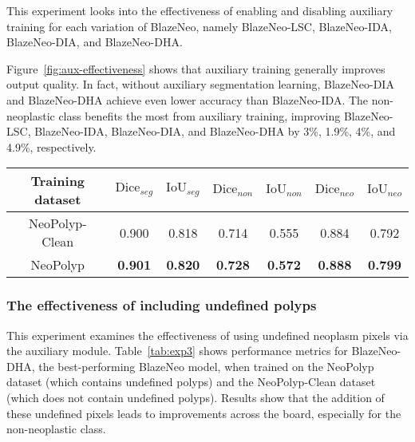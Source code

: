\documentclass{ieeeaccess}
\newcommand{\ModelName}{BlazeNeo\xspace}
\newcommand{\DHA}{BlazeNeo-DHA\xspace}
\newcommand{\DIA}{BlazeNeo-DIA\xspace}
\newcommand{\IDA}{BlazeNeo-IDA\xspace}
\newcommand{\LSC}{BlazeNeo-LSC\xspace}
\newcommand{\DatasetName}{NeoPolyp\xspace}
\newcommand{\CleanDatasetName}{NeoPolyp-Clean\xspace}
\begin{document}
This experiment looks into the effectiveness of enabling and disabling auxiliary training for each variation of \ModelName, namely \LSC, \IDA, \DIA, and \DHA.

Figure~\ref{fig:aux-effectiveness} shows that auxiliary training generally improves output quality. In fact, without auxiliary segmentation learning, \DIA and \DHA achieve even lower accuracy than \IDA. The non-neoplastic class benefits the most from auxiliary training, improving \LSC, \IDA, \DIA, and \DHA by 3\%, 1.9\%, 4\%, and 4.9\%, respectively.



\begin{table*}[ht!]
    \centering
    \caption{Performance metrics for \DHA when training on \DatasetName and \CleanDatasetName, measured on the \DatasetName test set}
    \label{tab:exp3}
    \begin{tabular}{@{} c| c c c c c c @{}}
        \toprule
        
        \multicolumn{1}{c|}{Training dataset} & \multicolumn{1}{c}{$\text{Dice}_{seg}$} & \multicolumn{1}{c}{$\text{IoU}_{seg}$} & \multicolumn{1}{c}{$\text{Dice}_{non}$} & \multicolumn{1}{c}{$\text{IoU}_{non}$} & \multicolumn{1}{c}{$\text{Dice}_{neo}$} & \multicolumn{1}{c}{$\text{IoU}_{neo}$} \\ \midrule \midrule
        \CleanDatasetName                     & 0.900                                   & 0.818                                  & 0.714                                   & 0.555                                  & 0.884                                   & 0.792                                  \\
        \DatasetName                          & \textbf{0.901}                          & \textbf{0.820}                         & \textbf{0.728}                          & \textbf{0.572}                         & \textbf{0.888}                          & \textbf{0.799}                         \\
        
        \bottomrule
    \end{tabular}
\end{table*}

\subsubsection{The effectiveness of including undefined polyps}
This experiment examines the effectiveness of using undefined neoplasm pixels via the auxiliary module. Table~\ref{tab:exp3} shows performance metrics for \DHA, the best-performing \ModelName model, when trained on the \DatasetName dataset (which contains undefined polyps) and the \CleanDatasetName dataset (which does not contain undefined polyps). Results show that the addition of these undefined pixels leads to improvements across the board, especially for the non-neoplastic class.
\end{document}
